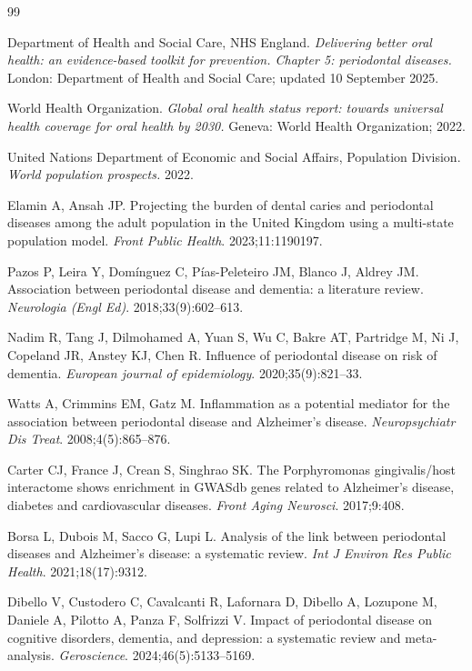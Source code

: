\documentclass[11pt,a4paper]{article}
\begin{document}
\begin{thebibliography}{99}

 Department of Health and Social Care, NHS England. \textit{Delivering better oral health: an evidence-based toolkit for prevention. Chapter 5: periodontal diseases.} London: Department of Health and Social Care; updated 10 September 2025.

 World Health Organization. \textit{Global oral health status report: towards universal health coverage for oral health by 2030.} Geneva: World Health Organization; 2022.

 United Nations Department of Economic and Social Affairs, Population Division. \textit{World population prospects.} 2022.

 Elamin A, Ansah JP. Projecting the burden of dental caries and periodontal diseases among the adult population in the United Kingdom using a multi-state population model. \textit{Front Public Health}. 2023;11:1190197.

 Pazos P, Leira Y, Domínguez C, Pías-Peleteiro JM, Blanco J, Aldrey JM. Association between periodontal disease and dementia: a literature review. \textit{Neurologia (Engl Ed)}. 2018;33(9):602--613.

 Nadim R, Tang J, Dilmohamed A, Yuan S, Wu C, Bakre AT, Partridge M, Ni J, Copeland JR, Anstey KJ, Chen R. Influence of periodontal disease on risk of dementia. \textit{European journal of epidemiology}. 2020;35(9):821--33.

 Watts A, Crimmins EM, Gatz M. Inflammation as a potential mediator for the association between periodontal disease and Alzheimer's disease. \textit{Neuropsychiatr Dis Treat}. 2008;4(5):865--876.

 Carter CJ, France J, Crean S, Singhrao SK. The Porphyromonas gingivalis/host interactome shows enrichment in GWASdb genes related to Alzheimer's disease, diabetes and cardiovascular diseases. \textit{Front Aging Neurosci}. 2017;9:408.

 Borsa L, Dubois M, Sacco G, Lupi L. Analysis of the link between periodontal diseases and Alzheimer's disease: a systematic review. \textit{Int J Environ Res Public Health}. 2021;18(17):9312.

 Dibello V, Custodero C, Cavalcanti R, Lafornara D, Dibello A, Lozupone M, Daniele A, Pilotto A, Panza F, Solfrizzi V. Impact of periodontal disease on cognitive disorders, dementia, and depression: a systematic review and meta-analysis. \textit{Geroscience}. 2024;46(5):5133--5169.


\end{thebibliography}
\end{document}
